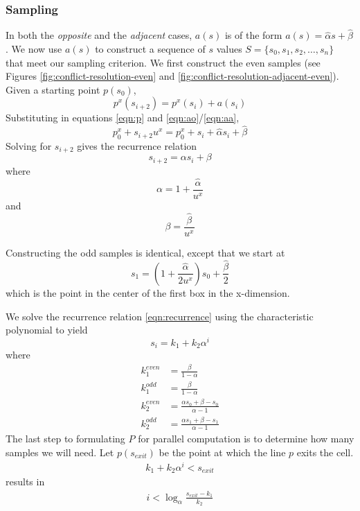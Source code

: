 \documentclass[submission]{gmp2017}
\begin{document}
\subsubsection{Sampling}
In both the \textit{opposite} and the \textit{adjacent} cases, $a(s)$ is of the form $a(s) = \hat{\alpha} s + \hat{\beta}$. We now use $a(s)$ to construct a sequence of $s$ values $S = \{s_0, s_1, s_2, \dots, s_n\}$ that meet our sampling criterion. We first construct the even samples (see Figures \ref{fig:conflict-resolution-even} and \ref{fig:conflict-resolution-adjacent-even}). Given a starting point $p(s_0)$,
\begin{equation}
p^x(s_{i+2}) = p^x(s_i) + a(s_i)
\end{equation}
Substituting in equations \eqref{eqn:p} and \eqref{eqn:ao}/\eqref{eqn:aa},
\begin{equation}
p_0^x + s_{i+2}u^x = p_0^x + s_i + \hat{\alpha} s_i + \hat{\beta}
\end{equation}
Solving for $s_{i+2}$ gives the recurrence relation
\begin{equation}
s_{i+2} = \alpha s_i + \beta \label{eqn:recurrence}
\end{equation}
where
\begin{equation}
\alpha = 1 + \frac{\hat{\alpha}}{u^x}
\end{equation}
and
\begin{equation}
\beta = \frac{\hat{\beta}}{u^x}
\end{equation}

Constructing the odd samples is identical, except that we start at
\begin{equation}
s_1 = \left(1+\frac{\hat{\alpha}}{2u^x}\right)s_0 + \frac{\hat{\beta}}{2}
\end{equation}
which is the point in the center of the first box in the x-dimension.

We solve the recurrence relation \eqref{eqn:recurrence} using the characteristic polynomial to yield
\begin{equation}
s_i = k_1 + k_2 \alpha^i
\end{equation}
where
\begin{align}
k_1^{even} &= \frac{\beta}{1-\alpha} \\
k_1^{odd} &= \frac{\beta}{1-\alpha} \\
k_2^{even} &= \frac{\alpha s_0 + \beta - s_0}{\alpha-1} \\
k_2^{odd} &= \frac{\alpha s_1 + \beta - s_1}{\alpha-1}
\end{align}
The last step to formulating $P$ for parallel computation is to determine how many samples we will need. Let $p(s_{exit})$ be the point at which the line $p$ exits the cell.
\begin{align}
k_1+k_2\alpha^i < s_{exit}
\end{align}
results in
\begin{align}
i < \log_{\alpha}\frac{s_{exit}-k_1}{k_2}
\end{align}
\end{document}
